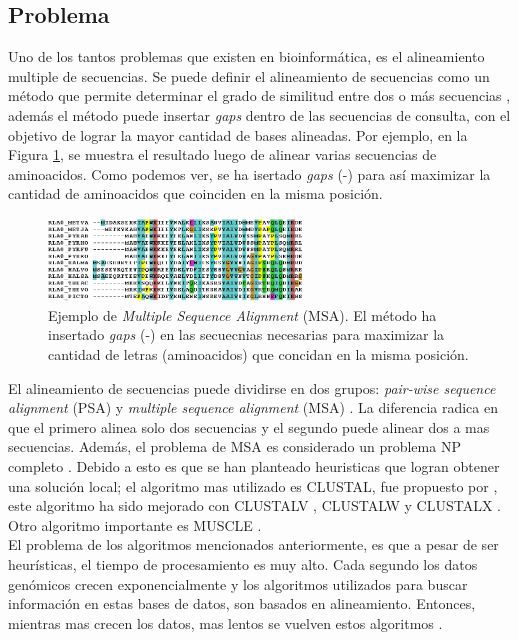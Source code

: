 \documentclass[conference]{IEEEtran}
\begin{document}
\subsection{Problema}

Uno de los tantos problemas que existen en bioinformática, es el alineamiento multiple de secuencias. Se puede definir el alineamiento de secuencias como un método que permite determinar el grado de similitud entre dos o más secuencias \cite{xiong2006essential}, además el método puede insertar \textit{gaps} dentro de las secuencias de consulta, con el objetivo de lograr la mayor cantidad de bases alineadas. Por ejemplo, en la Figura \ref{fig:msa}, se muestra el resultado luego de alinear varias secuencias de aminoacidos. Como podemos ver, se ha isertado \textit{gaps} (-) para así maximizar la cantidad de aminoacidos que coinciden en la misma posición. \\

\begin{figure}[h]
	\centering
	\includegraphics[width=0.6\textwidth]{images/msa}
	\caption{Ejemplo de \textit{Multiple Sequence Alignment} (MSA). El método ha insertado \textit{gaps} (-) en las secuecnias necesarias para maximizar la cantidad de letras (aminoacidos) que concidan en la misma posición.}
	\label{fig:msa}
\end{figure}

El alineamiento de secuencias puede dividirse en dos grupos: \textit{pair-wise sequence alignment} (PSA) y \textit{multiple sequence alignment} (MSA) \cite{xiong2006essential}. La diferencia radica en que el primero alinea solo dos secuencias y el segundo puede alinear dos a mas secuencias. Además, el problema de MSA es considerado un problema NP completo \cite{wang1994complexity}. Debido a esto es que se han planteado heuristicas que logran obtener una solución local; el algoritmo mas utilizado es CLUSTAL, fue propuesto por \cite{higgins1988clustal}, este algoritmo ha sido mejorado con CLUSTALV \cite{higgins1992clustal}, CLUSTALW \cite{thompson1994clustal} y CLUSTALX \cite{jeanmougin1998multiple}. Otro algoritmo importante es MUSCLE \cite{edgar2004muscle}. \\


El problema de los algoritmos mencionados anteriormente, es que a pesar de ser heurísticas, el tiempo de procesamiento es muy alto. Cada segundo los datos genómicos crecen exponencialmente \cite{archibald2018genomics} y los algoritmos utilizados para buscar información en estas bases de datos, son basados en alineamiento. Entonces, mientras mas crecen los datos, mas lentos se vuelven estos algoritmos \cite{zablocki2009multiple}. 
\end{document}

